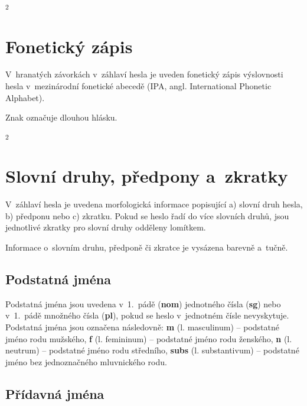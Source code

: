 \blspace
  \dicEntry {}\textsuperscript{2} \dicsymFrequent
\blspace

\section{Fonetický zápis}

V~hranatých závorkách v~záhlaví hesla je uveden fonetický zápis výslovnosti hesla v~mezinárodní fonetické abecedě (IPA, angl. International Phonetic Alphabet).

\blspace
  \dicEntry {} 
\blspace

Znak \uv{{\textlengthmark}} označuje dlouhou hlásku.

\blspace
  \dicEntry {}\textsuperscript{2} 
\blspace

\section{Slovní druhy, předpony a~zkratky}

V~záhlaví hesla je uvedena morfologická informace popisující a) slovní druh hesla, b) předponu nebo c) zkratku. Pokud se heslo řadí do více slovních druhů, jsou jednotlivé zkratky pro slovní druhy odděleny lomítkem.

\blspace
  \dicEntry {} 
\blspace

Informace o~slovním druhu, předponě či zkratce je vysázena barevně a~tučně.

\subsection*{Podstatná jména}

Podstatná jména jsou uvedena v~1.~pádě (\textbf{nom}) jednotného čísla (\textbf{sg}) nebo v~1.~pádě množného čísla (\textbf{pl}), pokud se heslo v~jednotném čísle nevyskytuje. Podstatná jména jsou označena následovně: \textbf{m} (l. masculinum) -- podstatné jméno rodu mužského,
\textbf{f} (l. femininum) -- podstatné jméno rodu ženského, \textbf{n} (l. neutrum) -- podstatné jméno rodu středního, \textbf{subs} (l. substantivum) -- podstatné jméno bez jednoznačného mluvnického rodu.

\blspace
  \dicEntry {} 
  \dicEntry {} 
\blspace

\subsection*{Přídavná jména}

